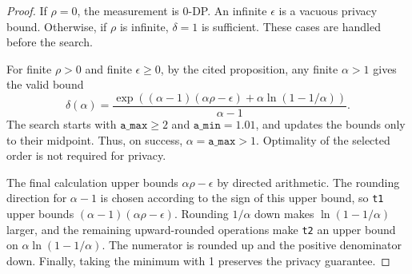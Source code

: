 \documentclass{article}
\begin{document}
\begin{proof}
    If $\rho=0$, the measurement is $0$-DP.
    An infinite $\epsilon$ is a vacuous privacy bound.
    Otherwise, if $\rho$ is infinite, $\delta=1$ is sufficient.
    These cases are handled before the search.

    For finite $\rho>0$ and finite $\epsilon\geq 0$, by the cited proposition,
    any finite $\alpha>1$ gives the valid bound
    \[
        \delta(\alpha)=
        \frac{\exp((\alpha-1)(\alpha\rho-\epsilon)+\alpha\ln(1-1/\alpha))}
             {\alpha-1}.
    \]
    The search starts with $\texttt{a\_max}\geq 2$ and $\texttt{a\_min}=1.01$,
    and updates the bounds only to their midpoint.
    Thus, on success, $\alpha=\texttt{a\_max}>1$.
    Optimality of the selected order is not required for privacy.

    The final calculation upper bounds $\alpha\rho-\epsilon$ by directed arithmetic.
    The rounding direction for $\alpha-1$ is chosen according to the sign of this upper bound,
    so \texttt{t1} upper bounds $(\alpha-1)(\alpha\rho-\epsilon)$.
    Rounding $1/\alpha$ down makes $\ln(1-1/\alpha)$ larger,
    and the remaining upward-rounded operations make \texttt{t2} an upper bound on $\alpha\ln(1-1/\alpha)$.
    The numerator is rounded up and the positive denominator down.
    Finally, taking the minimum with 1 preserves the privacy guarantee.
\end{proof}



\end{document}
